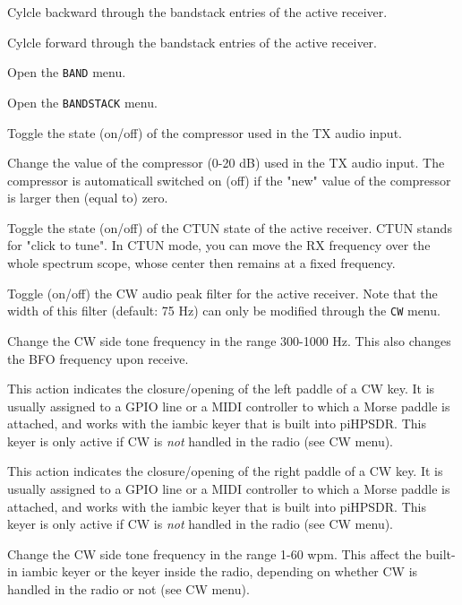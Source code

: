 \documentclass[12pt]{book}
\def\bltt#1{\texttt{\color{blue}#1}}
\begin{document}
{Cylcle backward through the bandstack entries of the active receiver.}

{Cylcle forward through the bandstack entries of the active receiver.}

{Open the \texttt{BAND} menu.}

{Open the \texttt{BANDSTACK} menu.}

{Toggle the state (on/off) of the compressor used in the TX audio input.}

{Change the value of the compressor (0-20 dB) used in the TX audio input. The compressor is automaticall 
switched on (off) if the "new" value of the compressor is larger then  (equal to) zero.}

{Toggle the state (on/off) of the CTUN state of the active receiver. CTUN stands for "click to tune". In 
CTUN mode, you can move
the RX frequency over the whole spectrum scope, whose center then remains at a fixed frequency.}

{Toggle (on/off) the CW audio peak filter for the active receiver. Note that the width of this
filter (default: 75 Hz) can only be modified through the \bltt{CW} menu.}

{Change the CW side tone frequency in the range 300-1000 Hz. This also changes the BFO frequency upon 
receive.}

{This action indicates the closure/opening of the left paddle of a CW key. It is usually assigned to a GPIO 
line or a MIDI
controller to which a Morse paddle is attached, and works with the iambic keyer that is built into piHPSDR. 
This keyer
is only active if CW is \textit{not} handled in the radio (see CW menu).}

{This action indicates the closure/opening of the right paddle of a CW key. It is usually assigned to a GPIO 
line or a MIDI
controller to which a Morse paddle is attached, and works with the iambic keyer that is built into piHPSDR. 
This keyer
is only active if CW is \textit{not} handled in the radio (see CW menu).}

{Change the CW side tone frequency in the range 1-60 wpm. This affect the built-in iambic keyer or the keyer 
inside the radio,
depending on whether CW is handled in the radio or not (see CW menu).}
\end{document}
